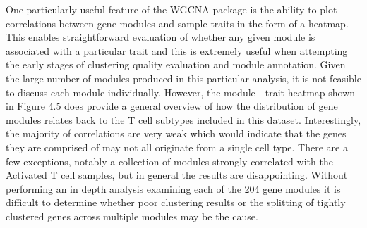 One particularly useful feature of the WGCNA package is the ability to plot correlations between gene modules and sample traits in the form of a heatmap. This enables straightforward evaluation of whether any given module is associated with a particular trait and this is extremely useful when attempting the early stages of clustering quality evaluation and module annotation. Given the large number of modules produced in this particular analysis, it is not feasible to discuss each module individually. However, the module - trait heatmap shown in Figure 4.5 does provide a general overview of how the distribution of gene modules relates back to the T cell subtypes included in this dataset. Interestingly, the majority of correlations are very weak which would indicate that the genes they are comprised of may not all originate from a single cell type. There are a few exceptions, notably a collection of modules strongly correlated with the Activated T cell samples, but in general the results are disappointing. Without performing an in depth analysis examining each of the 204 gene modules it is difficult to determine whether poor clustering results or the splitting of tightly clustered genes across multiple modules may be the cause. 

